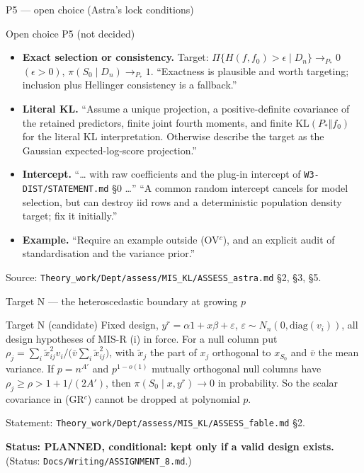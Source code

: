 \begin{frame}{P5 --- open choice (Astra's lock conditions)}
\small
\begin{block}{Open choice P5 (not decided)}
\begin{itemize}
  \item \textbf{Exact selection or consistency.} Target: $\Pi\{H(f,f_0)>\epsilon\mid D_n\}\to_{P_*}0$ $(\epsilon>0)$,
    $\pi(S_0\mid D_n)\to_{P_*}1$. ``Exactness is plausible and worth targeting; inclusion plus Hellinger consistency is a
    fallback.''
  \item \textbf{Literal KL.} ``Assume a unique projection, a positive-definite covariance of the retained predictors, finite
    joint fourth moments, and finite $\mathrm{KL}(P_*\Vert f_0)$ for the literal KL interpretation. Otherwise describe the
    target as the Gaussian expected-log-score projection.''
  \item \textbf{Intercept.} ``\dots{} with raw coefficients and the plug-in intercept of \texttt{W3-DIST/STATEMENT.md} \S0 \dots''
    ``A common random intercept cancels for model selection, but can destroy iid rows and a deterministic population
    density target; fix it initially.''
  \item \textbf{Example.} ``Require an example outside (OV$^{c}$), and an explicit audit of standardisation and the
    variance prior.''
\end{itemize}
\end{block}
{\footnotesize Source: \texttt{Theory\_work/Dept/assess/MIS\_KL/ASSESS\_astra.md} \S2, \S3, \S5.}
\end{frame}

\begin{frame}{Target N --- the heteroscedastic boundary at growing $p$}
\begin{alertblock}{Target N (candidate)}
Fixed design, $y^r=\alpha1+x\beta+\varepsilon$, $\varepsilon\sim N_n(0,\mathrm{diag}(v_i))$, all design hypotheses of
MIS-R (i) in force. For a null column put
$\rho_j=\sum_i\tilde x_{ij}^2v_i\big/\big(\bar v\sum_i\tilde x_{ij}^2\big)$, with $\tilde x_j$ the part of $x_j$ orthogonal
to $x_{S_0}$ and $\bar v$ the mean variance. If $p=n^{A'}$ and $p^{1-o(1)}$ mutually orthogonal null columns have
$\rho_j\ge\rho>1+1/(2A')$, then $\pi(S_0\mid x,y^r)\to0$ in probability. So the scalar covariance in (GR$^{c}$) cannot
be dropped at polynomial $p$.
\end{alertblock}
{\footnotesize Statement: \texttt{Theory\_work/Dept/assess/MIS\_KL/ASSESS\_fable.md} \S2.}\par
\textbf{Status: PLANNED, conditional: kept only if a valid design exists.}
{\footnotesize (Status: \texttt{Docs/Writing/ASSIGNMENT\_8.md}.)}
\end{frame}
